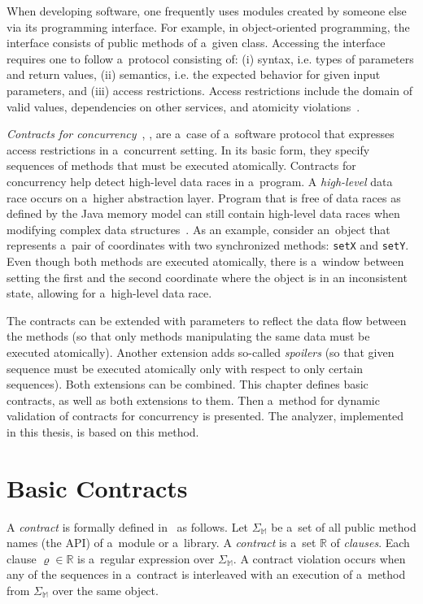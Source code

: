 When developing software, one frequently uses modules created by someone else
via its programming interface. For example, in object-oriented programming, the
interface consists of public methods of a~given class. Accessing the interface
requires one to follow a~protocol consisting of: (i) syntax, i.e. types of
parameters and return values, (ii) semantics, i.e. the expected behavior for
given input parameters, and (iii) access restrictions. Access restrictions
include the domain of valid values, dependencies on other services, and
atomicity violations~\cite{contracts}.

\emph{Contracts for concurrency}~\cite{FITPUB10817},
\cite{DBLP:journals/corr/SousaDFL15}, are a~case of a~software protocol that
expresses access restrictions in a~concurrent setting. In its basic form, they
specify sequences of methods that must be executed atomically. Contracts for
concurrency help detect high-level data races in a~program. A \emph{high-level}
data race occurs on a~higher abstraction layer. Program that is free of data
races as defined by the Java memory model can still contain high-level data
races when modifying complex data structures~\cite{highLevelDataRaces}. As an
example, consider an~object that represents a~pair of coordinates with two
synchronized methods: \texttt{setX} and \texttt{setY}. Even though both methods
are executed atomically, there is a~window between setting the first and the
second coordinate where the object is in an inconsistent state, allowing for
a~high-level data race.

The contracts can
be extended with parameters to reflect the data flow between the methods (so
that only methods manipulating the same data must be executed atomically).
Another extension adds so-called \emph{spoilers} (so that given sequence must be
executed atomically only with respect to only certain sequences). Both
extensions can be combined. This chapter defines basic contracts, as well as
both extensions to them. Then a~method for dynamic validation of contracts for
concurrency is presented. The analyzer, implemented in this thesis, is based on
this method.

\section{Basic Contracts}
\label{basicContracts}

A \emph{contract} is formally defined in~\cite{FITPUB10817} as follows. Let
$\Sigma_\mathbb{M}$ be a~set of all public method names (the API) of a~module or
a~library. A \emph{contract} is a~set $\mathbb{R}$ of \emph{clauses}. Each
clause $\varrho \in \mathbb{R}$ is a~regular expression over
$\Sigma_\mathbb{M}$. A contract violation occurs when any of the sequences in
a~contract is interleaved with an execution of a~method from $\Sigma_\mathbb{M}$
over the same object.

